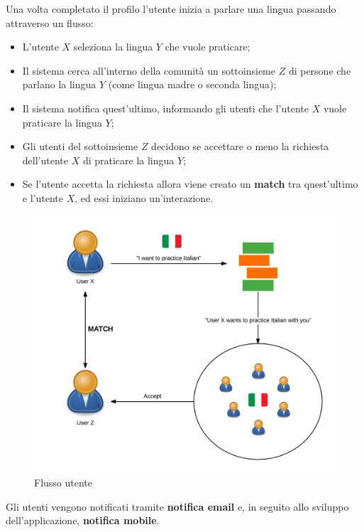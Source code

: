Una volta completato il profilo l'utente inizia a parlare una lingua passando attraverso un flusso:

\begin{itemize}

\item L'utente $X$ seleziona la lingua $Y$ che vuole praticare;
\item Il sistema cerca all'interno della comunità un sottoinsieme $Z$ di persone che parlano la lingua $Y$ (come lingua madre o seconda lingua);
\item Il sistema notifica quest'ultimo, informando gli utenti che l'utente $X$ vuole praticare la lingua $Y$;
\item Gli utenti del sottoinsieme $Z$ decidono se accettare o meno la richiesta dell'utente $X$ di praticare la lingua $Y$;
\item Se l'utente accetta la richiesta allora viene creato un \textbf{match} tra quest'ultimo e l'utente $X$, ed essi iniziano un'interazione.

\end{itemize}

\begin{figure}[htpd]
\centering
\includegraphics[width=\textwidth]{../immagini/coffeestrap-flow}
\caption{Flusso utente}
\end{figure}

Gli utenti vengono notificati tramite \textbf{notifica email} e, in seguito allo sviluppo dell'applicazione, \textbf{notifica mobile}.

